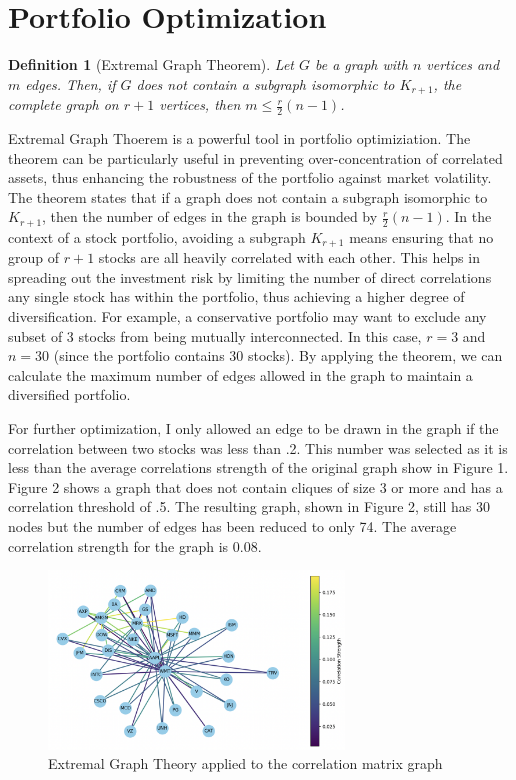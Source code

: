\documentclass{article}
\newtheorem{definition}[theorem]{Definition}
\begin{document}
\section{Portfolio Optimization}

\begin{definition}[Extremal Graph Theorem] Let $G$ be a graph with $n$ vertices and $m$ edges. Then, if $G$ does not contain a subgraph isomorphic to $K_{r+1}$, the complete graph on $r+1$ vertices, then $m \leq \frac{r}{2}(n-1)$.
\end{definition}

Extremal Graph Thoerem is a powerful tool in portfolio optimiziation. The theorem can be particularly useful in preventing over-concentration of correlated assets, thus enhancing the robustness of the portfolio against market volatility. The theorem states that if a graph does not contain a subgraph isomorphic to $K_{r+1}$, then the number of edges in the graph is bounded by $\frac{r}{2}(n-1)$. In the context of a stock portfolio, avoiding a subgraph $K_{r+1}$ means ensuring that no group of $r+1$ stocks are all heavily correlated with each other. This helps in spreading out the investment risk by limiting the number of direct correlations any single stock has within the portfolio, thus achieving a higher degree of diversification. For example, a conservative portfolio may want to exclude any subset of 3 stocks from being mutually interconnected. In this case, $r = 3$ and $n = 30$ (since the portfolio contains 30 stocks). By applying the theorem, we can calculate the maximum number of edges allowed in the graph to maintain a diversified portfolio.

For further optimization, I only allowed an edge to be drawn in the graph if the correlation between two stocks was less than .2. This number was selected as it is less than the average correlations strength of the original graph show in Figure 1. Figure 2 shows a graph that does not contain cliques of size 3 or more and has a correlation threshold of .5. The resulting graph, shown in Figure 2, still has 30 nodes but the number of edges has been reduced to only 74. The average correlation strength for the graph is 0.08.

\begin{figure}[h]
    \caption{Extremal Graph Theory applied to the correlation matrix graph}
    \centering
    \includegraphics[width=0.7\textwidth]{extremal_graph_theory.png}
\end{figure}    
\end{document}
